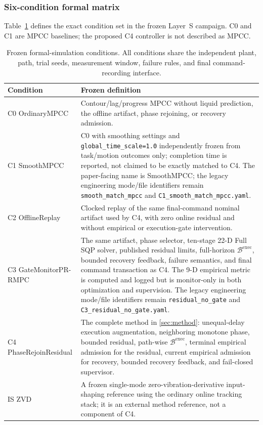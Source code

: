\subsubsection{Six-condition formal matrix}

Table~\ref{tab:core_conditions} defines the exact condition set in the frozen
Layer~S campaign.  C0 and C1 are MPCC baselines; the proposed C4 controller is
not described as MPCC.

\begin{table}[t]
  \centering
  \caption{Frozen formal-simulation conditions.  All conditions share the
  independent plant, path, trial seeds, measurement window, failure rules, and
  final command-recording interface.}
  \label{tab:core_conditions}
  \small
  \begin{tabular}{@{}p{}p{}@{}}
    \toprule
    Condition & Frozen definition \\
    \midrule
    C0 OrdinaryMPCC & Contour/lag/progress MPCC without liquid prediction, the offline artifact, phase rejoining, or recovery admission. \\
    C1 SmoothMPCC & C0 with smoothing settings and \texttt{global\_time\_scale=1.0} independently frozen from task/motion outcomes only; completion time is reported, not claimed to be exactly matched to C4.  The paper-facing name is SmoothMPCC; the legacy engineering mode/file identifiers remain \texttt{smooth\_match\_mpcc} and \texttt{C1\_smooth\_match\_mpcc.yaml}. \\
    C2 OfflineReplay & Clocked replay of the same final-command nominal artifact used by C4, with zero online residual and without empirical or execution-gate intervention. \\
    C3 GateMonitorPR-RMPC & The same artifact, phase selector, ten-stage 22-D Full SQP solver, published residual limits, full-horizon $\mathcal B^{\mathrm{exec}}$, bounded recovery feedback, failure semantics, and final command transaction as C4.  The 9-D empirical metric is computed and logged but is monitor-only in both optimization and supervision.  The legacy engineering mode/file identifiers remain \texttt{residual\_no\_gate} and \texttt{C3\_residual\_no\_gate.yaml}. \\
    C4 PhaseRejoinResidual & The complete method in \cref{sec:method}: unequal-delay execution augmentation, neighboring monotone phase, bounded residual, path-wise $\mathcal B^{\mathrm{exec}}$, terminal empirical admission for the residual, current empirical admission for recovery, bounded recovery feedback, and fail-closed supervisor. \\
    IS ZVD & A frozen single-mode zero-vibration-derivative input-shaping reference using the ordinary online tracking stack; it is an external method reference, not a component of C4. \\
    \bottomrule
  \end{tabular}
\end{table}

